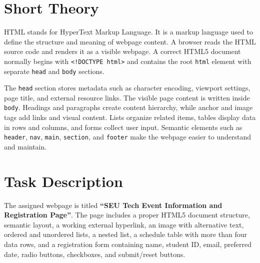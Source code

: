 \documentclass[12pt,a4paper]{article}
\begin{document}
\section{Short Theory}
HTML stands for HyperText Markup Language. It is a markup language used to define the structure and meaning of webpage content. A browser reads the HTML source code and renders it as a visible webpage. A correct HTML5 document normally begins with \texttt{<!DOCTYPE html>} and contains the root \texttt{html} element with separate \texttt{head} and \texttt{body} sections.

The \texttt{head} section stores metadata such as character encoding, viewport settings, page title, and external resource links. The visible page content is written inside \texttt{body}. Headings and paragraphs create content hierarchy, while anchor and image tags add links and visual content. Lists organize related items, tables display data in rows and columns, and forms collect user input. Semantic elements such as \texttt{header}, \texttt{nav}, \texttt{main}, \texttt{section}, and \texttt{footer} make the webpage easier to understand and maintain.
\section{Task Description}
The assigned webpage is titled \textbf{``SEU Tech Event Information and Registration Page''}. The page includes a proper HTML5 document structure, semantic layout, a working external hyperlink, an image with alternative text, ordered and unordered lists, a nested list, a schedule table with more than four data rows, and a registration form containing name, student ID, email, preferred date, radio buttons, checkboxes, and submit/reset buttons.
\end{document}
